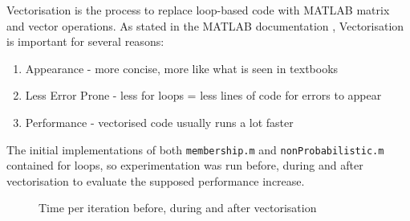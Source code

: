 Vectorisation is the process to replace loop-based code with MATLAB matrix and vector operations. As stated in the MATLAB documentation \cite{vectorisation}, Vectorisation is important for several reasons:

\begin{enumerate}
    \item Appearance - more concise, more like what is seen in textbooks
    \item Less Error Prone - less for loops = less lines of code for errors to appear
    \item Performance - vectorised code usually runs a lot faster
\end{enumerate}

The initial implementations of both \texttt{membership.m} and \texttt{nonProbabilistic.m} contained for loops, so experimentation was run before, during and after vectorisation to evaluate the supposed performance increase.

\begin{figure}[H]
  \centering
    \caption{Time per iteration before, during and after vectorisation}
    \label{fig:time-per-iteration}
\end{figure}

